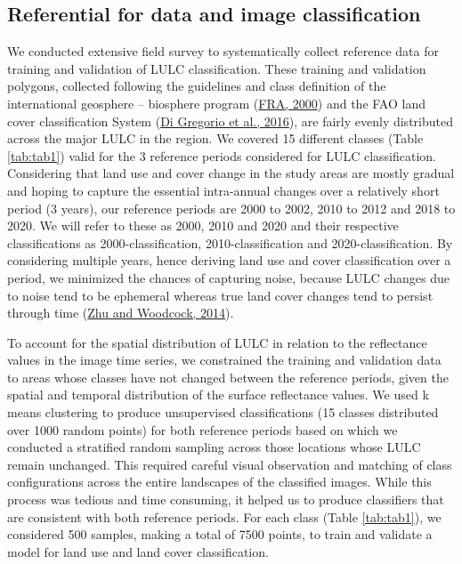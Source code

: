 \documentclass[utf8]{frontiersSCNS}
\begin{document}
\hypertarget{ref24}{%
\subsection{Referential for data and image classification}\label{ref24}}

We conducted extensive field survey to systematically collect reference
data for training and validation of LULC classification. These training
and validation polygons, collected following the guidelines and class
definition of the international geosphere -- biosphere program
(\protect\hyperlink{ref-FRA-2000}{FRA, 2000}) and the FAO land cover
classification System (\protect\hyperlink{ref-Di-Gregorio-et-al-2016}{Di
Gregorio et al., 2016}), are fairly evenly distributed across the major
LULC in the region. We covered 15 different classes (Table
\ref{tab:tab1}) valid for the 3 reference periods considered for LULC
classification. Considering that land use and cover change in the study
areas are mostly gradual and hoping to capture the essential
intra-annual changes over a relatively short period (3 years), our
reference periods are 2000 to 2002, 2010 to 2012 and 2018 to 2020. We
will refer to these as 2000, 2010 and 2020 and their respective
classifications as 2000-classification, 2010-classification and
2020-classification. By considering multiple years, hence deriving land
use and cover classification over a period, we minimized the chances of
capturing noise, because LULC changes due to noise tend to be ephemeral
whereas true land cover changes tend to persist through time
(\protect\hyperlink{ref-Zhu-and-Woodcock-2014}{Zhu and Woodcock, 2014}).

To account for the spatial distribution of LULC in relation to the
reflectance values in the image time series, we constrained the training
and validation data to areas whose classes have not changed between the
reference periods, given the spatial and temporal distribution of the
surface reflectance values. We used k means clustering to produce
unsupervised classifications (15 classes distributed over 1000 random
points) for both reference periods based on which we conducted a
stratified random sampling across those locations whose LULC remain
unchanged. This required careful visual observation and matching of
class configurations across the entire landscapes of the classified
images. While this process was tedious and time consuming, it helped us
to produce classifiers that are consistent with both reference periods.
For each class (Table \ref{tab:tab1}), we considered 500 samples, making
a total of 7500 points, to train and validate a model for land use and
land cover classification.
\end{document}
